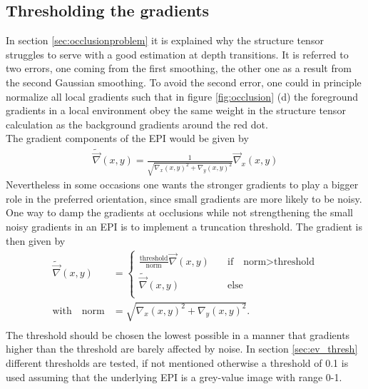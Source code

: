 \documentclass  [
  paper    = a4,
  BCOR     = 10mm,
  twoside,
  fontsize = 12pt,
  fleqn,
  toc      = bibnumbered,
  toc      = listofnumbered,
  numbers  = noendperiod,
  headings = normal,
  listof   = leveldown,
  version  = 3.03
]                                       {scrreprt}
\begin{document}
 \subsection{Thresholding the gradients}
 \label{sec:thresholdinggradients}
 In section \ref{sec:occlusionproblem} it is explained why the structure tensor struggles to serve with a  good estimation at depth transitions. It is referred to two errors, one coming from the first smoothing, the other one as a result from the second Gaussian smoothing. To avoid the second error, one could in principle normalize all local gradients such that in figure \ref{fig:occlusion} (d) the foreground gradients in a local environment obey the same weight in the structure tensor calculation as the background gradients around the red dot.\\
 The gradient components of the EPI would be given by
 \begin{align}
 	\tilde{\vec \nabla}(x,y) = \frac{1}{\sqrt{\nabla_x(x,y)^2 + \nabla_y(x,y)^2}} \vec \nabla_x(x,y)
 \end{align}
 Nevertheless in some occasions one wants the stronger gradients to play a bigger role in the preferred orientation, since small gradients are more likely to be noisy. One way to damp the gradients at occlusions while not strengthening the small noisy gradients in an EPI is to implement a truncation threshold. The gradient is then given by
 \begin{align}
 \tilde{\vec \nabla}(x,y) &= \begin{cases}
\frac{\text{threshold}}{\text{norm}} \vec \nabla(x,y) \quad &\text{if}\quad \text{norm}> \text{threshold}\\
\tilde{\vec \nabla}(x,y)\qquad &\text{else}\\
 \end{cases} \\
\text{with} \quad \text{norm} &= \sqrt{\nabla_x(x,y)^2 + \nabla_y(x,y)^2}.\\
 \end{align}
 The threshold should be chosen the lowest possible in a manner that gradients higher than the threshold are barely affected by noise. In section \ref{sec:ev_thresh} different thresholds are tested, if not mentioned otherwise a threshold of 0.1 is used assuming that the underlying EPI is a grey-value image with range 0-1.\\
 
\end{document}
